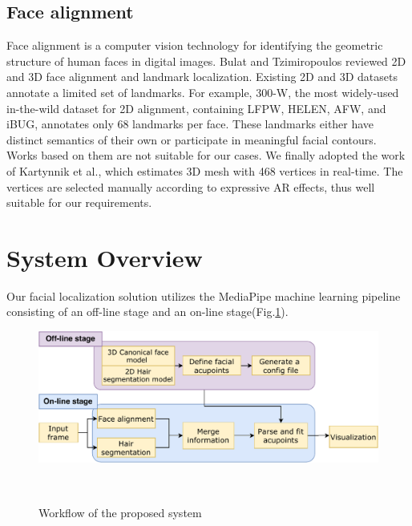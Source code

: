 \subsection{Face alignment}
\label{sec:related-face-align}
Face alignment is a computer vision technology for identifying the geometric structure of human faces in digital images. Bulat and Tzimiropoulos\cite{bulat2017far} reviewed 2D and 3D face alignment and landmark localization. Existing 2D and 3D datasets annotate a limited set of landmarks. For example, 300-W\cite{sagonas2013semi}, the most widely-used in-the-wild dataset for 2D alignment, containing LFPW\cite{belhumeur2013localizing}, HELEN\cite{le2012interactive}, AFW\cite{zhu2012face}, and iBUG\cite{sagonas2013semi}, annotates only 68 landmarks per face. These landmarks either have distinct semantics of their own or participate in meaningful facial contours. Works based on them are not suitable for our cases. We finally adopted the work of Kartynnik et al.\cite{kartynnik2019real}, which estimates 3D mesh with 468 vertices in real-time. The vertices are selected manually according to expressive AR effects, thus well suitable for our requirements.

\section{System Overview}
Our facial localization solution utilizes the MediaPipe machine learning pipeline consisting of an off-line stage and an on-line stage(Fig.\ref{fig:structure}).
\begin{figure}
\centering
  \includegraphics[width=0.9\columnwidth]{figures/structure.pdf}
  \caption{Workflow of the proposed system}~\label{fig:structure}
\end{figure}

